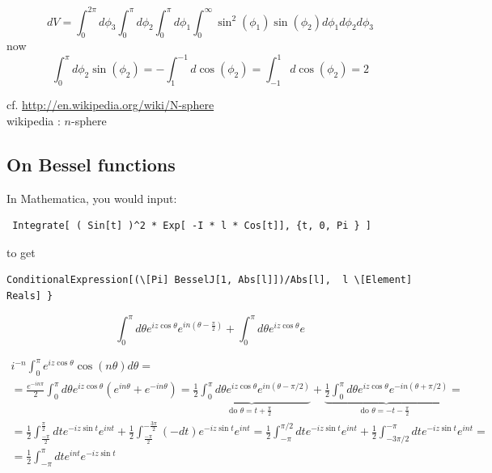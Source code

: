 \documentclass[twoside]{amsart}
\begin{document}
\[
dV = \int_0^{ 2 \pi } d\phi_3 \int_0^{\pi} d\phi_2 \int_0^{\pi} d\phi_1 \int_0^{\infty} \sin^2{ ( \phi_1)} \sin{ ( \phi_2) } d\phi_1 d\phi_2 d\phi_3 
\]
now 
\[
\int_0^{\pi} d\phi_2 \sin{ (\phi_2) } = - \int_{1}^{-1} d\cos{ ( \phi_2) } = \int_{-1}^1 d\cos{ (\phi_2) } = 2
\]

cf. \url{http://en.wikipedia.org/wiki/N-sphere} \\
wikipedia : $n$-sphere

\subsection*{ On Bessel functions }

In Mathematica, you would input:  \\

\begin{verbatim}
 Integrate[ ( Sin[t] )^2 * Exp[ -I * l * Cos[t]], {t, 0, Pi } ] 
\end{verbatim}

to get 

\begin{verbatim}  
ConditionalExpression[(\[Pi] BesselJ[1, Abs[l]])/Abs[l],  l \[Element] Reals] }
\end{verbatim}


\[
\int_0^{\pi} d\theta e^{i z \cos{\theta} } e^{ i n \left(  \theta - \frac{\pi}{2} \right) } + \int_0^{\pi} d\theta e^{iz \cos{\theta} } e^{}
\]

\[
\begin{gathered}
  i^{-n} \int_0^{\pi} e^{ i z \cos{\theta} } \cos{ (n\theta ) } d\theta = \\
  = \frac{ e^{ - i n \pi } }{2} \int_0^{\pi} d\theta e^{ i z \cos{\theta }} ( e^{ i n \theta } + e^{- i n \theta } ) = \underbrace{ \frac{1}{2} \int_0^{\pi} d\theta e^{ i z \cos{\theta } } e^{ in ( \theta - \pi/2 ) }  }_{ \text{ do $\theta = t + \frac{ \pi} {2} $ } }  + \underbrace{  \frac{1}{2} \int_0^{\pi} d\theta e^{ i z \cos{\theta } } e^{ - i n ( \theta + \pi/2 )  }  }_{ \text{ do $\theta = -t - \frac{\pi}{2}$ }}  = \\ 
  = \frac{1}{2} \int^{  \frac{ \pi}{2} }_{ \frac{- \pi}{2} } dt e^{ -iz \sin{t } } e^{ int } + \frac{1}{2} \int_{  \frac{ -\pi}{2} }^{ - \frac{ 3 \pi}{2} } (-dt) e^{-iz \sin{t} } e^{int } = \frac{1}{2} \int_{-\pi}^{ \pi/2} dt e^{- iz \sin{t}} e^{ int } + \frac{1}{2} \int_{ -3\pi /2}^{ -\pi} dt e^{ -iz \sin{t} } e^{int} = \\
   = \frac{1}{2} \int_{-\pi}^{ \pi} dt e^{int} e^{-iz \sin{t}}
\end{gathered}
\]
\end{document}
